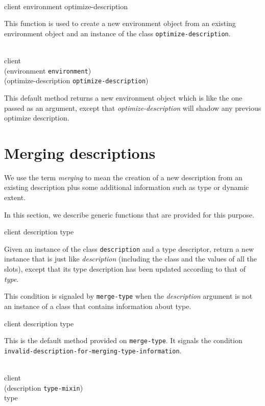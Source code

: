 {\footnotesize
{}\\
            {client environment optimize-description}
}

This function is used to create a new environment object from an
existing environment object and an instance of the class
\texttt{optimize-description}.

{\footnotesize
{}\\
           {client\\
            (environment {\tt environment})\\
            (optimize-description {\tt optimize-description})}
}

This default method returns a new environment object which is like the
one passed as an argument, except that \textit{optimize-description}
will shadow any previous optimize description.

\section{Merging descriptions}

We use the term \emph{merging} to mean the creation of a new
description from an existing description plus some
additional information such as type or dynamic extent.

In this section, we describe generic functions that are provided for
this purpose.

{\footnotesize
{} {client description type}
}

Given an instance of the class \texttt{description} and a
type descriptor, return a new instance that is just like
\textit{description} (including the class and the values of
all the slots), except that its type description has been updated
according to that of \textit{type}.

{\footnotesize
{}
}

This condition is signaled by \texttt{merge-type} when the
\textit{description} argument is not an instance of a class that
contains information about type.

{\footnotesize
{} {client description type}
}

This is the default method provided on \texttt{merge-type}.  It
signals the condition
\texttt{invalid-description-for-merging-type-information}.

{\footnotesize
{}\\
           {client\\
            (description {\tt type-mixin})\\
            type}
}

